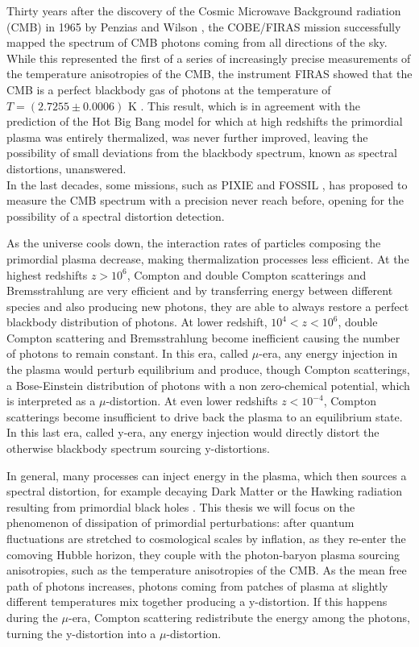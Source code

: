 Thirty years after the discovery of the Cosmic Microwave Background radiation (CMB) in 1965 by Penzias and Wilson \cite{1965ApJ...142..419P}, the COBE/FIRAS mission \cite{COBE1996} successfully mapped the spectrum of CMB photons coming from all directions of the sky. While this represented the first of a series of increasingly precise measurements of the temperature anisotropies of the CMB, the instrument FIRAS showed that the CMB is a perfect blackbody gas of photons at the temperature of $T=(2.7255\pm0.0006)$ K \cite{COBE1996}. This result, which is in agreement with the prediction of the Hot Big Bang model for which at high redshifts the primordial plasma was entirely thermalized, was never further improved, leaving the possibility of small deviations from the blackbody spectrum, known as spectral distortions, unanswered.\\ In the last decades, some missions, such as PIXIE \cite{pixie} and FOSSIL \cite{IAS_Fossil}, has proposed to measure the CMB spectrum with a precision never reach before, opening for the possibility of a spectral distortion detection.

As the universe cools down, the interaction rates of particles composing the primordial plasma decrease, making thermalization processes less efficient. At the highest redshifts $z>10^{6}$, Compton and double Compton scatterings and Bremsstrahlung are very efficient and by transferring energy between different species and also producing new photons, they are able to always restore a perfect blackbody distribution of photons. At lower redshift, $10^{4}<z<10^{6}$, double Compton scattering and Bremsstrahlung become inefficient causing the number of photons to remain constant. In this era, called $\mu$-era, any energy injection in the plasma would perturb equilibrium and produce, though Compton scatterings, a Bose-Einstein distribution of photons with a non zero-chemical potential, which is interpreted as a $\mu$-distortion. At even lower redshifts $z<10^{-4}$, Compton scatterings become insufficient to drive back the plasma to an equilibrium state. In this last era, called y-era, any energy injection would directly distort the otherwise blackbody spectrum sourcing y-distortions.

In general, many processes can inject energy in the plasma, which then sources a spectral distortion, for example decaying Dark Matter or the Hawking radiation resulting from primordial black holes \cite{Lucca_2020}. This thesis we will focus on the phenomenon of dissipation of primordial perturbations: after quantum fluctuations are stretched to cosmological scales by inflation, as they re-enter the comoving Hubble horizon, they couple with the photon-baryon plasma sourcing anisotropies, such as the temperature anisotropies of the CMB. As the mean free path of photons increases, photons coming from patches of plasma at slightly different temperatures mix together producing a y-distortion. If this happens during the $\mu$-era, Compton scattering redistribute the energy among the photons, turning the y-distortion into a $\mu$-distortion.\\


